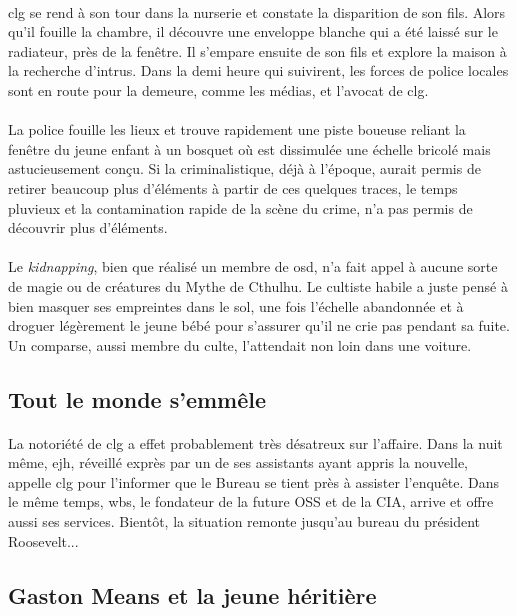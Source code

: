 \paragraph{} \gls{clg} se rend à son tour dans la nurserie et constate la disparition de son fils. Alors qu'il fouille la chambre,
il découvre une enveloppe blanche qui a été laissé sur le radiateur, près de la fenêtre. Il s'empare ensuite de son fils et explore 
la maison à la recherche d'intrus. Dans la demi heure qui suivirent, les forces de police locales sont en route pour la demeure,
comme les médias, et l'avocat de \gls{clg}.
\paragraph{} La police fouille les lieux et trouve rapidement une piste boueuse reliant la fenêtre du jeune enfant à un bosquet
où est dissimulée une échelle bricolé mais astucieusement conçu. Si la criminalistique, déjà à l'époque, aurait permis de retirer
beaucoup plus d'éléments à partir de ces quelques traces, le temps pluvieux et la contamination rapide de la scène du crime, n'a 
pas permis de découvrir plus d'éléments.  
\paragraph{} Le \emph{kidnapping}, bien que réalisé un membre de \gls{osd}, n'a fait appel à aucune sorte de magie ou de créatures
du Mythe de Cthulhu. Le cultiste habile a juste pensé à bien masquer ses empreintes dans le sol, une fois l'échelle abandonnée et 
à droguer légèrement le jeune bébé pour s'assurer qu'il ne crie pas pendant sa fuite. Un comparse, aussi membre du culte, l'attendait
non loin dans une voiture.
\subsection{Tout le monde s'emmêle}
\paragraph{} La notoriété de \gls{clg} a effet probablement très désatreux sur l'affaire. Dans la nuit même, \gls{ejh}, réveillé exprès
par un de ses assistants ayant appris la nouvelle, appelle \gls{clg} pour l'informer que le Bureau se tient près à assister l'enquête.
Dans le même temps, \gls{wbs}, le fondateur de la future OSS et de la CIA, arrive et offre aussi ses services. Bientôt, la situation
remonte jusqu'au bureau du président Roosevelt...
\subsection{Gaston Means et la jeune héritière}
